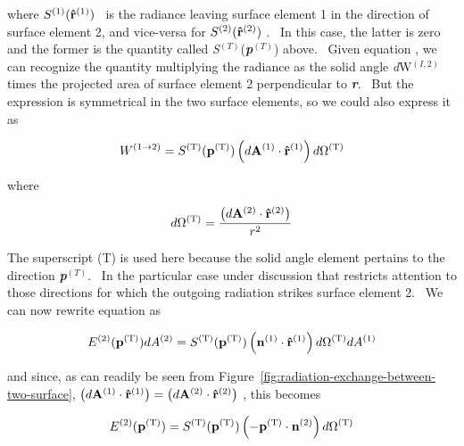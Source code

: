 where \({S^{{\rm{(1)}}}}({{\bf{\hat r}}^{{\rm{(1)}}}})\) ~is the radiance leaving surface element 1 in the direction of surface element 2, and vice-versa for \({S^{{\rm{(2)}}}}({{\bf{\hat r}}^{{\rm{(2)}}}})\) .~ In this case, the latter is zero and the former is the quantity called \emph{S}\(^{(T)}\)(\textbf{\emph{p}}\(^{(T)}\)) above.~ Given equation , we can recognize the quantity multiplying the radiance as the solid angle \emph{d}W\(^{(I,2)}\) times the projected area of surface element 2 perpendicular to \textbf{\emph{r}}.~ But the expression is symmetrical in the two surface elements, so we could also express it as

\begin{equation}
{W^{(1 \to 2)}} = {S^{{\rm{(T)}}}}({{\bf{p}}^{{\rm{(T)}}}})\left( {d{{\bf{A}}^{{\rm{(1)}}}} \cdot {{{\bf{\hat r}}}^{{\rm{(1)}}}}} \right)d{\Omega ^{{\rm{(T)}}}}
\end{equation}

where

\begin{equation}
d{\Omega ^{{\rm{(T)}}}} = \frac{{\left( {d{{\bf{A}}^{{\rm{(2)}}}} \cdot {{{\bf{\hat r}}}^{{\rm{(2)}}}}} \right)}}{{{r^2}}}
\end{equation}

The superscript (T) is used here because the solid angle element pertains to the direction \textbf{\emph{p}}\(^{(T)}\).~ In the particular case under discussion that restricts attention to those directions for which the outgoing radiation strikes surface element 2.~ We can now rewrite equation as

\begin{equation}
{E^{{\rm{(2)}}}}({{\bf{p}}^{{\rm{(T)}}}})d{A^{{\rm{(2)}}}} = {S^{{\rm{(T)}}}}({{\bf{p}}^{{\rm{(T)}}}})\left( {{{\bf{n}}^{{\rm{(1)}}}} \cdot {{{\bf{\hat r}}}^{{\rm{(1)}}}}} \right)d{\Omega ^{{\rm{(T)}}}}d{A^{{\rm{(1)}}}}
\end{equation}

and since, as can readily be seen from Figure~\ref{fig:radiation-exchange-between-two-surface}, \(\left( {d{{\bf{A}}^{{\rm{(1)}}}} \cdot {{{\bf{\hat r}}}^{{\rm{(1)}}}}} \right) = \left( {d{{\bf{A}}^{{\rm{(2)}}}} \cdot {{{\bf{\hat r}}}^{{\rm{(2)}}}}} \right)\) , this becomes

\begin{equation}
{E^{{\rm{(2)}}}}({{\bf{p}}^{{\rm{(T)}}}}) = {S^{{\rm{(T)}}}}({{\bf{p}}^{{\rm{(T)}}}})\left( { - {{\bf{p}}^{{\rm{(T)}}}} \cdot {{\bf{n}}^{{\rm{(2)}}}}} \right)d{\Omega ^{{\rm{(T)}}}}
\end{equation}

